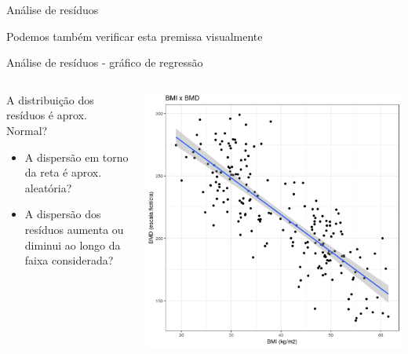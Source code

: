 \documentclass{beamer}
\begin{document}
\begin{frame}{Análise de resíduos}
  \begin{center}
    \Large
    Podemos também verificar esta premissa visualmente
  \end{center}
\end{frame}

\begin{frame}{\footnotesize Análise de resíduos - gráfico de regressão}
  \begin{columns}
    \begin{column}{5cm}
      A distribuição dos resíduos é aprox. Normal?
      \bigskip
      \begin{itemize}
        \footnotesize
      \item A dispersão em torno da reta é aprox. aleatória?
        \bigskip
      \item A dispersão dos resíduos aumenta ou diminui ao longo da faixa considerada?
      \end{itemize}
    \end{column}
    \begin{column}{5cm}
      \begin{center}
        \includegraphics[width=1.1\textwidth]{Cap18-19/pratica-rls2}
      \end{center}
    \end{column}
  \end{columns}
\end{frame}
\end{document}
